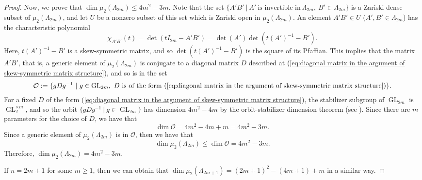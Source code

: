 \documentclass[reqno]{amsart}
\theoremstyle{definition}
\numberwithin{equation}{section}
\begin{document}
\begin{proof}
        Now, we prove that $\dim \mu_2(\Lambda_{2m}) \leq 4m^2-3m$. Note that the set $\{A'B'~|~A'~\text{is invertible in}~\Lambda_{2m},~B' \in \Lambda_{2m}\}$ is a Zariski dense subset of $\mu_2(\Lambda_{2m})$, and let $U$ be a nonzero subset of this set which is Zariski open in $\mu_2(\Lambda_{2m})$. An element $A'B' \in U$ ($A',B' \in \Lambda_{2m}$) has the characteristic polynomial
        \begin{equation*}
            \chi_{A'B'}(t)=\det(tI_{2m}-A'B')=\det(A')\det(t(A')^{-1}-B').
        \end{equation*}
        Here, $t(A')^{-1}-B'$ is a skew-symmetric matrix, and so $\det(t(A')^{-1}-B')$ is the square of its Pfaffian. This implies that the matrix $A'B'$, that is, a generic element of $\mu_2(\Lambda_{2m})$ is conjugate to a diagonal matrix $D$ described at (\ref{eq:diagonal matrix in the argument of skew-symmetric matrix structure}), and so is in the set
        \begin{equation*}
            \mathcal{O}:=\{gDg^{-1}~|~g \in \operatorname{GL}_{2m},~D~\text{is of the form (\ref{eq:diagonal matrix in the argument of skew-symmetric matrix structure})}\}.
        \end{equation*}
        For a fixed $D$ of the form (\ref{eq:diagonal matrix in the argument of skew-symmetric matrix structure}), the stabilizer subgroup of $\operatorname{GL}_{2m}$ is $\operatorname{GL}_2^{\times m}$, and so the orbit $\{gDg^{-1}~|~g \in \operatorname{GL}_{2m}\}$ has dimension $4m^2-4m$ by the orbit-stabilizer dimension theorem (see \cite[Corollary 5.5.6]{MR1642713}). Since there are $m$ parameters for the choice of $D$, we have that
        \begin{equation*}
            \dim \mathcal{O} =4m^2-4m+m =4m^2-3m.
        \end{equation*}
        Since a generic element of $\mu_2(\Lambda_{2m})$ is in $\mathcal{O}$, then we have that
        \begin{equation*}
            \dim \mu_2(\Lambda_{2m}) \leq \dim \mathcal{O} = 4m^2-3m.
        \end{equation*}
        Therefore, $\dim \mu_2(\Lambda_{2m}) = 4m^2-3m$.

        If $n=2m+1$ for some $m \geq 1$, then we can obtain that $\dim \mu_2(\Lambda_{2m+1})=(2m+1)^2-(4m+1)+m$ in a similar way. 
\end{proof}
\end{document}
